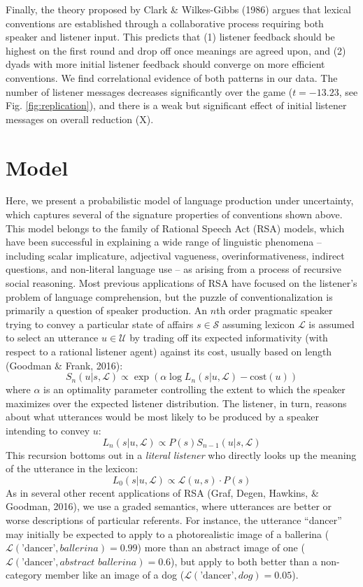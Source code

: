 \documentclass[manuscript]{stjour}
\begin{document}
Finally, the theory proposed by Clark \& Wilkes-Gibbs (1986) argues that
lexical conventions are established through a collaborative process
requiring both speaker and listener input. This predicts that (1)
listener feedback should be highest on the first round and drop off once
meanings are agreed upon, and (2) dyads with more initial listener
feedback should converge on more efficient conventions. We find
correlational evidence of both patterns in our data. The number of
listener messages decreases significantly over the game (\(t = -13.23\),
see Fig. \ref{fig:replication}), and there is a weak but significant
effect of initial listener messages on overall reduction (X).

\section{Model}\label{model}

Here, we present a probabilistic model of language production under
uncertainty, which captures several of the signature properties of
conventions shown above. This model belongs to the family of Rational
Speech Act (RSA) models, which have been successful in explaining a wide
range of linguistic phenomena -- including scalar implicature,
adjectival vagueness, overinformativeness, indirect questions, and
non-literal language use -- as arising from a process of recursive
social reasoning. Most previous applications of RSA have focused on the
listener's problem of language comprehension, but the puzzle of
conventionalization is primarily a question of speaker production. An
\(n\)th order pragmatic speaker trying to convey a particular state of
affairs \(s \in \mathcal{S}\) assuming lexicon \(\mathcal{L}\) is
assumed to select an utterance \(u \in \mathcal{U}\) by trading off its
expected informativity (with respect to a rational listener agent)
against its cost, usually based on length (Goodman \& Frank, 2016):
\[S_n(u | s, \mathcal{L}) \propto \exp{\left(\alpha \log L_n(s | u, \mathcal{L}) - \textrm{cost}(u)\right)}\]
where \(\alpha\) is an optimality parameter controlling the extent to
which the speaker maximizes over the expected listener distribution. The
listener, in turn, reasons about what utterances would be most likely to
be produced by a speaker intending to convey \(u\):
\[L_n(s | u, \mathcal{L}) \propto P(s) S_{n-1}(u | s, \mathcal{L})\]
\indent This recursion bottoms out in a \emph{literal listener} who
directly looks up the meaning of the utterance in the lexicon:
\[L_0(s | u, \mathcal{L}) \propto \mathcal{L}(u, s)\cdot P(s)\]
\indent As in several other recent applications of RSA (Graf, Degen,
Hawkins, \& Goodman, 2016), we use a graded semantics, where utterances
are better or worse descriptions of particular referents. For instance,
the utterance ``dancer'' may initially be expected to apply to a
photorealistic image of a ballerina
(\(\mathcal{L}(\textrm{'dancer'}, \textit{ballerina}) = 0.99\)) more
than an abstract image of one
(\(\mathcal{L}(\textrm{'dancer'}, \textit{abstract ballerina}) =0.6\)),
but apply to both better than a non-category member like an image of a
dog (\(\mathcal{L}(\textrm{'dancer'}, \textit{dog}) = 0.05\)).
\end{document}
